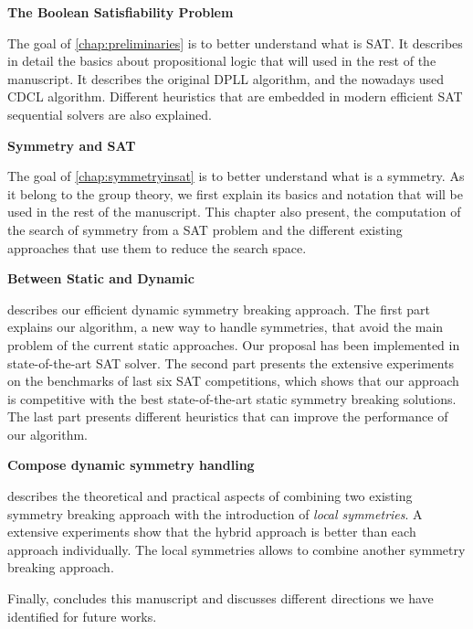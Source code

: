 \textbf{The Boolean Satisfiability Problem}

The goal of \cref{chap:preliminaries} is to better understand what is SAT. It describes in detail
the basics about propositional logic that will used in the rest of the manuscript. 
It describes the original DPLL algorithm, and the nowadays used CDCL algorithm.
Different heuristics that are embedded in modern efficient SAT sequential solvers are also explained. 

\textbf{Symmetry and SAT}

The goal of \cref{chap:symmetryinsat} is to better understand what is a symmetry. As it belong to the 
group theory, we first explain its basics and notation that will be used in the rest of the manuscript.
This chapter also present, the computation of the search of symmetry from a SAT problem and 
the different existing approaches that use them to reduce the search space.

\textbf{Between Static and Dynamic}

 describes our efficient dynamic symmetry breaking approach.
The first part explains our algorithm, a new way to handle symmetries, that avoid the main problem
of the current static approaches. Our proposal has been implemented in state-of-the-art
SAT solver. The second part presents the extensive experiments on the benchmarks of last six SAT competitions,
which shows that our approach is competitive with the best state-of-the-art static symmetry breaking solutions.
The last part presents different heuristics that can improve the performance of our algorithm.



\textbf{Compose dynamic symmetry handling}

 describes the theoretical and practical aspects of combining two existing
symmetry  breaking approach with the introduction of \textit{local symmetries}.
 A extensive experiments show that the hybrid approach is better than 
each approach individually. The local symmetries allows to combine another 
symmetry breaking approach.

Finally,  concludes this manuscript and discusses different directions we have identified for future works.
 

